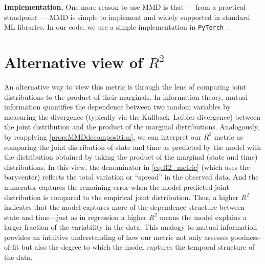 \textbf{Implementation.} One more reason to use MMD is that --- from a practical standpoint --- MMD is simple to implement and widely supported in standard ML libraries. In our code, we use a simple implementation in \texttt{PyTorch} \citep{paszke2019pytorch}.



\section{Alternative view of $R^2$}
\label{app:alternativeR2}
An alternative way to view this metric is through the lens of comparing joint distributions to the product of their marginals. In information theory, mutual information quantifies the dependence between two random variables by measuring the divergence (typically via the Kullback–Leibler divergence) between the joint distribution and the product of the marginal distributions. Analogously, by reapplying \cref{prop:MMDdecomposition}, we can interpret our $R^2$ metric as comparing the joint distribution of state and time as predicted by the model with the distribution obtained by taking the product of the marginal (state and time) distributions. In this view, the denominator in \cref{eq:R2_metric} (which uses the barycenter) reflects the total variation or “spread” in the observed data. And the numerator captures the remaining error when the model-predicted joint distribution is compared to the empirical joint distribution. Thus, a higher $R^2$ indicates that the model captures more of the dependence structure between state and time—just as in regression a higher $R^2$ means the model explains a larger fraction of the variability in the data. This analogy to mutual information provides an intuitive understanding of how our metric not only assesses goodness-of-fit but also the degree to which the model captures the temporal structure of the data.